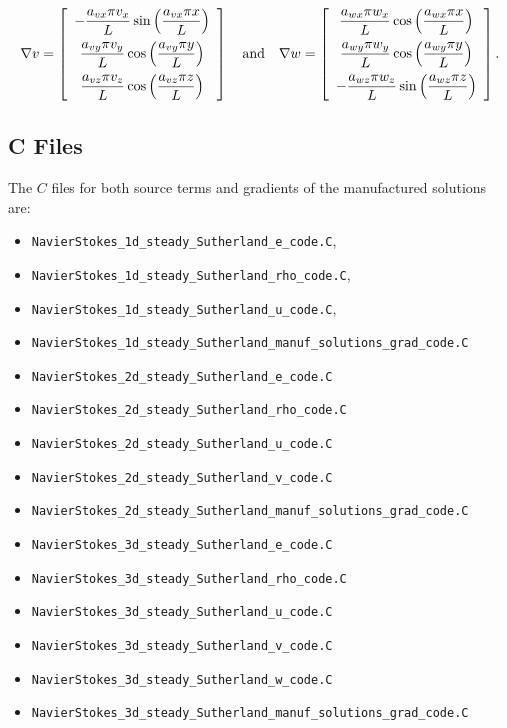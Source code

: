 \documentclass[10pt]{article}
\begin{document}
\begin{equation*}
\nabla  v= \left[ \begin{array}{c}
-  \dfrac{  a_{vx}  \pi v_x}{L}  \sin\left( \dfrac{ a_{vx}  \pi  x}{L}\right)\vspace{5pt}\\
    \dfrac{  a_{vy}  \pi v_y}{L} \cos\left( \dfrac{ a_{vy}  \pi  y}{L}\right)\vspace{5pt}\\
   \dfrac{  a_{vz}  \pi v_z }{L} \cos\left( \dfrac{ a_{vz}  \pi  z}{L}\right)
\end{array} \right]
\quad\mbox{and}\quad
\nabla w = \left[ \begin{array}{c}
\dfrac{  a_{wx}  \pi  w_x}{L} \cos\left( \dfrac{ a_{wx}  \pi  x}{L}\right)\vspace{5pt}\\
  \dfrac{  a_{wy}  \pi w_y}{L}  \cos\left( \dfrac{ a_{wy}  \pi  y}{L}\right)\vspace{5pt} \\
 - \dfrac{  a_{wz}  \pi w_z}{L}  \sin\left( \dfrac{ a_{wz}  \pi  z}{L}\right)
\end{array} \right].
\end{equation*}


\subsection{C Files}
The $C$ files for both source terms and gradients of the  manufactured solutions are:
\begin{itemize}
 \item \texttt{NavierStokes\_1d\_steady\_Sutherland\_e\_code.C},
 \item \texttt{NavierStokes\_1d\_steady\_Sutherland\_rho\_code.C},
 \item \texttt{NavierStokes\_1d\_steady\_Sutherland\_u\_code.C},
 \item \texttt{NavierStokes\_1d\_steady\_Sutherland\_manuf\_solutions\_grad\_code.C}
 \item \texttt{NavierStokes\_2d\_steady\_Sutherland\_e\_code.C}
 \item \texttt{NavierStokes\_2d\_steady\_Sutherland\_rho\_code.C}
 \item \texttt{NavierStokes\_2d\_steady\_Sutherland\_u\_code.C}
 \item \texttt{NavierStokes\_2d\_steady\_Sutherland\_v\_code.C}
 \item \texttt{NavierStokes\_2d\_steady\_Sutherland\_manuf\_solutions\_grad\_code.C}
 \item \texttt{NavierStokes\_3d\_steady\_Sutherland\_e\_code.C}
 \item \texttt{NavierStokes\_3d\_steady\_Sutherland\_rho\_code.C}
 \item \texttt{NavierStokes\_3d\_steady\_Sutherland\_u\_code.C}
 \item \texttt{NavierStokes\_3d\_steady\_Sutherland\_v\_code.C}
 \item \texttt{NavierStokes\_3d\_steady\_Sutherland\_w\_code.C}
 \item \texttt{NavierStokes\_3d\_steady\_Sutherland\_manuf\_solutions\_grad\_code.C}
\end{itemize}
\end{document}
